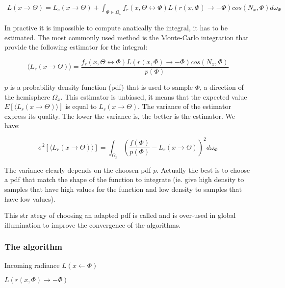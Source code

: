\begin{align*}
L(x \rightarrow \Theta) = L_e(x \rightarrow \Theta) + \int_{\Phi \in \Omega_x} f_r(x, \Theta \leftrightarrow \Phi) L(r(x, \Phi) \rightarrow -\Phi) cos(N_x, \Phi) d\omega_\Phi
\end{align*}

In practive it is impossible to compute anatically the integral, it has to be estimated. The most commonly used method is the Monte-Carlo integration that provide the following estimator for the integral:

\begin{equation*}
\langle L_r(x \rightarrow \Theta) \rangle = \frac{f_r(x, \Theta \leftrightarrow \Phi) L(r(x, \Phi) \rightarrow -\Phi) cos(N_x, \Phi)}{p(\Phi)}
\end{equation*}

$p$ is a probability density function (pdf) that is used to sample $\Phi$, a direction of the hemisphere $\Omega_x$. This estimator is unbiased, it means that the expected value $E[\langle L_r(x \rightarrow \Theta) \rangle]$ is equal to $L_r(x \rightarrow \Theta)$. The variance of the estimator express its quality. The lower the variance is, the better is the estimator. We have:

\begin{equation*}
\sigma^2[\langle L_r(x \rightarrow \Theta) \rangle] = \int_{\Omega_x} (\frac{f(\Phi)}{p(\Phi)} - L_r(x \rightarrow \Theta))^2 d\omega_\Phi
\end{equation*}

The variance clearly depends on the choosen pdf $p$. Actually the best is to choose a pdf that match the shape of the function to integrate (ie. give high density to samples that have high values for the function and low density to samples that have low values).

This str	ategy of choosing an adapted pdf is called  and is over-used in global illumination to improve the convergence of the algorithms.

\subsubsection{The algorithm}

\begin{algorithm}[h!]
\label{algo::incoming_radiance}
\caption[incoming_radiance]{Incoming radiance $L(x \leftarrow \Phi)$}
\Return $L(r(x, \Phi) \rightarrow -\Phi)$\;
\end{algorithm}

